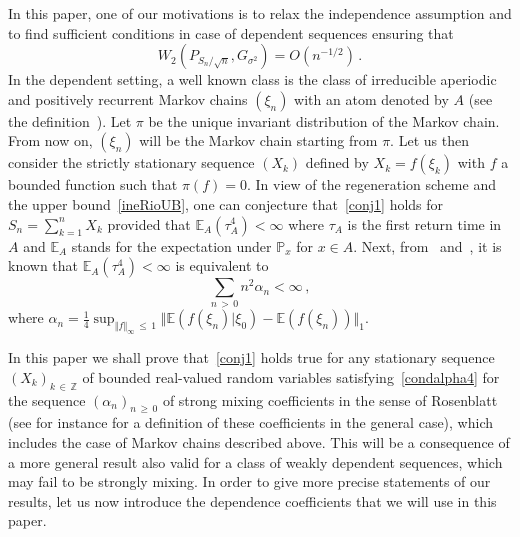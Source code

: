 \documentclass[10pt]{amsart}
\theoremstyle{definition}\newtheorem{defi}[theo]{Definition}\newtheorem{rema}[theo]{Remark}\newtheorem{exam}[theo]{Example}\newtheorem{exem}[theo]{Example}\newtheorem{nota}[theo]{Notation}
\newcommand{\bbE}{\mathbb{E}}
\newcommand{\bbZ}{\mathbb{Z}}
\newcommand{\bbP}{\mathbb{P}}
\begin{document}
In this paper, one of our motivations is to relax the independence assumption and to find sufficient conditions in case of dependent sequences ensuring that
\begin{equation}\label{conj1}
W_2 \left(P_{S_n / \sqrt n }, G_{\sigma^2}\right) = O (n^{-1/2}) \,.
\end{equation}
In the dependent setting, a well known class is the class of irreducible aperiodic and positively recurrent Markov chains $(\xi_n)$ with an atom denoted by $A$ (see the definition~\cite[p.~286]{Bo82}). Let $\pi $ be the unique invariant distribution of the Markov chain. From now on, $(\xi_n)$ will be the Markov chain starting from $\pi$. Let us then consider the strictly stationary sequence $(X_k) $ defined by $X_k =f (\xi_k)$ with $f$ a bounded function such that $\pi(f) =0$. In view of the regeneration scheme and the upper bound~\eqref{ineRioUB}, one can conjecture that~\eqref{conj1} holds for $S_n = \sum_{k=1}^n X_k$ provided that $\bbE_A (\tau_A^4) < \infty$ where $\tau_A$ is the first return time in $A$ and $\bbE_A$ stands for the expectation under $\bbP_x$ for $x \in A$. Next, from~\cite[Lemma~3]{Bo82} and~\cite[p.~165]{Rio17}, it is known that $\bbE_A (\tau_A^4) < \infty$ is equivalent to
\begin{equation}\label{condalpha4}
\sum_{n\,>\,0} n^{2} \alpha_n < \infty \,,
\end{equation}
where $
\alpha_n = { \textstyle \frac{1}{4} } \sup_{\Vert f \Vert_{\infty}\,\leq\,1} \Vert \bbE (f(\xi_n) | \xi_0) - \bbE (f (\xi_n)) \Vert_1 $.

In this paper we shall prove that~\eqref{conj1} holds true for any stationary sequence $(X_k)_{k \,\in\,\bbZ}$ of bounded real-valued random variables satisfying~\eqref{condalpha4} for the sequence $(\alpha_n)_{n\,\geq\,0}$ of strong mixing coefficients in the sense of Rosenblatt (see for instance \cite[Section~5.1.1.]{MPU} for a definition of these coefficients in the general case), which includes the case of Markov chains described above. This will be a consequence of a more general result also valid for a class of weakly dependent sequences, which may fail to be strongly mixing. In order to give more precise statements of our results, let us now introduce the dependence coefficients that we will use in this paper.
\end{document}
